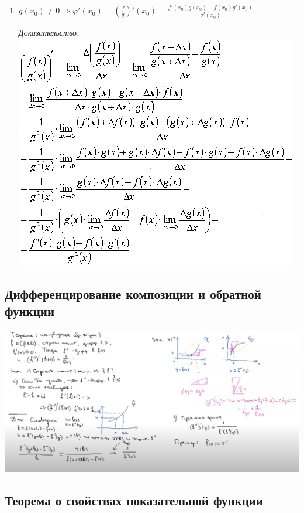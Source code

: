 \begin{enumerate}
    \dotfill
    
    \item $g(x_0) \not=0 \Rightarrow\varphi'(x_0) = (\frac{f}{g})'(x_0)=\frac{ f'(x_0)g(x_0)-f(x_0)g'(x_0)}{g^2(x_0)}$
    
    \textit{Доказательство.}  
    \includegraphics[scale=1]{Images/производная частного.jpg}
\end{enumerate}

\newpage
\subsection{Дифференцирование композиции и обратной функции}
    
\includegraphics[scale=0.5]{Images/Обратная.png}

\newpage
\subsection{Теорема о свойствах показательной функции}

